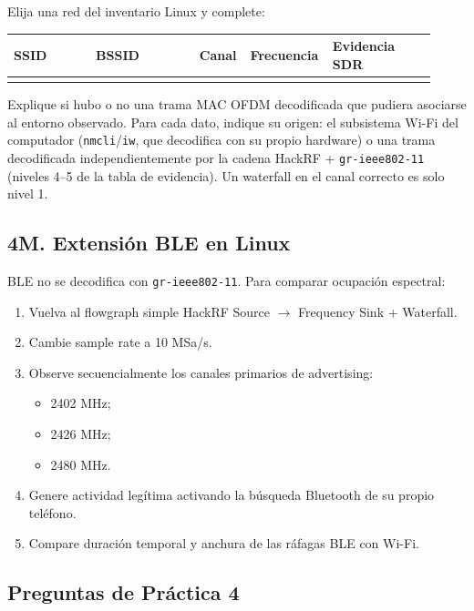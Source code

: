 Elija una red del inventario Linux y complete:

\begin{longtable}{@{}p{0.19\linewidth}p{0.24\linewidth}p{0.10\linewidth}p{0.15\linewidth}p{0.24\linewidth}@{}}
\toprule
SSID & BSSID & Canal & Frecuencia & Evidencia SDR \\
\midrule
\endhead
 & & & & \\
\bottomrule
\end{longtable}

Explique si hubo o no una trama MAC OFDM decodificada que pudiera asociarse al entorno observado. Para cada dato, indique su origen: el subsistema Wi-Fi del computador (\texttt{nmcli}/\texttt{iw}, que decodifica con su propio hardware) o una trama decodificada independientemente por la cadena HackRF + \texttt{gr-ieee802-11} (niveles 4--5 de la tabla de evidencia). Un waterfall en el canal correcto es solo nivel 1.

\subsection{4M. Extensión BLE en Linux}

BLE no se decodifica con \texttt{gr-ieee802-11}. Para comparar ocupación espectral:

\begin{enumerate}
    \item Vuelva al flowgraph simple HackRF Source $\rightarrow$ Frequency Sink + Waterfall.
    \item Cambie sample rate a 10 MSa/s.
    \item Observe secuencialmente los canales primarios de advertising:
    \begin{itemize}
        \item 2402 MHz;
        \item 2426 MHz;
        \item 2480 MHz.
    \end{itemize}
    \item Genere actividad legítima activando la búsqueda Bluetooth de su propio teléfono.
    \item Compare duración temporal y anchura de las ráfagas BLE con Wi-Fi.
\end{enumerate}

\subsection{Preguntas de Práctica 4}

